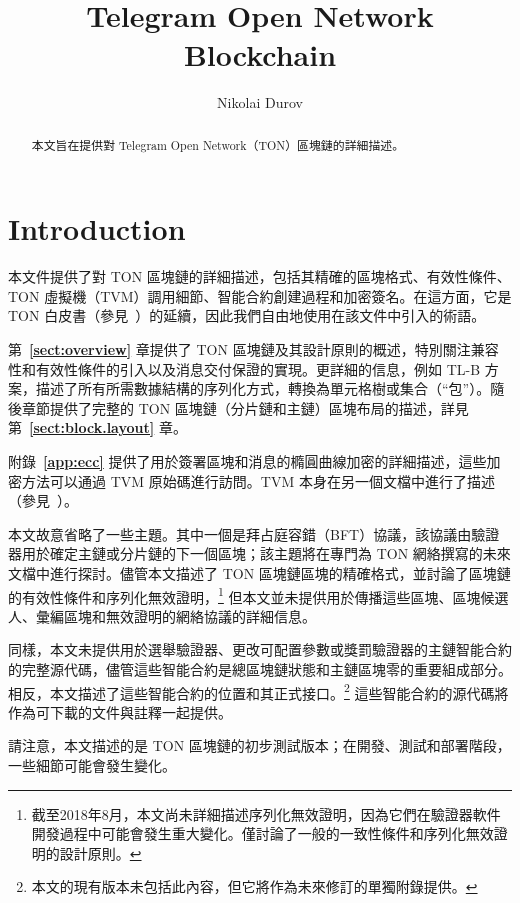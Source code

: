 \documentclass[12pt,oneside]{article}
\title{Telegram Open Network Blockchain}
\author{Nikolai Durov}
\def\refpoint#1{{\rm\textbf{\ref{#1}}}}
\let\ptref=\refpoint
\def\markbothsame#1{\fancyhead[C]{#1}}
\begin{document}
\maketitle

\begin{abstract}
本文旨在提供對 Telegram Open Network（TON）區塊鏈的詳細描述。
\end{abstract}

\section*{Introduction}
\markbothsame{Introduction}

本文件提供了對 TON 區塊鏈的詳細描述，包括其精確的區塊格式、有效性條件、TON 虛擬機（TVM）調用細節、智能合約創建過程和加密簽名。在這方面，它是 TON 白皮書（參見~\cite{TON}）的延續，因此我們自由地使用在該文件中引入的術語。

第~\ptref{sect:overview} 章提供了 TON 區塊鏈及其設計原則的概述，特別關注兼容性和有效性條件的引入以及消息交付保證的實現。更詳細的信息，例如 TL-B 方案，描述了所有所需數據結構的序列化方式，轉換為單元格樹或集合（“包”）。隨後章節提供了完整的 TON 區塊鏈（分片鏈和主鏈）區塊布局的描述，詳見第~\ptref{sect:block.layout} 章。

附錄~\ptref{app:ecc} 提供了用於簽署區塊和消息的橢圓曲線加密的詳細描述，這些加密方法可以通過 TVM 原始碼進行訪問。TVM 本身在另一個文檔中進行了描述（參見~\cite{TVM}）。

本文故意省略了一些主題。其中一個是拜占庭容錯（BFT）協議，該協議由驗證器用於確定主鏈或分片鏈的下一個區塊；該主題將在專門為 TON 網絡撰寫的未來文檔中進行探討。儘管本文描述了 TON 區塊鏈區塊的精確格式，並討論了區塊鏈的有效性條件和序列化無效證明，\footnote{截至2018年8月，本文尚未詳細描述序列化無效證明，因為它們在驗證器軟件開發過程中可能會發生重大變化。僅討論了一般的一致性條件和序列化無效證明的設計原則。} 但本文並未提供用於傳播這些區塊、區塊候選人、彙編區塊和無效證明的網絡協議的詳細信息。

同樣，本文未提供用於選舉驗證器、更改可配置參數或獎罰驗證器的主鏈智能合約的完整源代碼，儘管這些智能合約是總區塊鏈狀態和主鏈區塊零的重要組成部分。相反，本文描述了這些智能合約的位置和其正式接口。\footnote{本文的現有版本未包括此內容，但它將作為未來修訂的單獨附錄提供。} 這些智能合約的源代碼將作為可下載的文件與註釋一起提供。

請注意，本文描述的是 TON 區塊鏈的初步測試版本；在開發、測試和部署階段，一些細節可能會發生變化。

\clearpage
\tableofcontents
\end{document}
